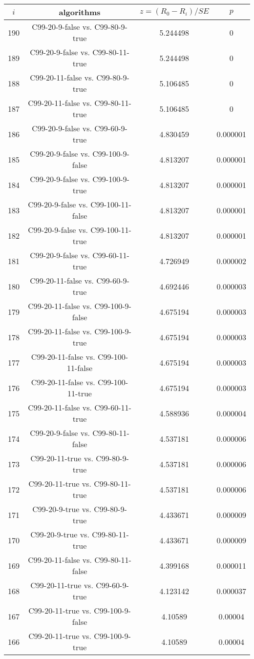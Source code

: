 \documentclass[a4paper,10pt]{article}
\begin{document}
\begin{landscape}
\begin{table}[!htp]
\centering\scriptsize
\begin{tabular}{cccc}
$i$&algorithms&$z=(R_0 - R_i)/SE$&$p$\\
\hline190&C99-20-9-false vs. C99-80-9-true&5.244498&0\\
189&C99-20-9-false vs. C99-80-11-true&5.244498&0\\
188&C99-20-11-false vs. C99-80-9-true&5.106485&0\\
187&C99-20-11-false vs. C99-80-11-true&5.106485&0\\
186&C99-20-9-false vs. C99-60-9-true&4.830459&0.000001\\
185&C99-20-9-false vs. C99-100-9-false&4.813207&0.000001\\
184&C99-20-9-false vs. C99-100-9-true&4.813207&0.000001\\
183&C99-20-9-false vs. C99-100-11-false&4.813207&0.000001\\
182&C99-20-9-false vs. C99-100-11-true&4.813207&0.000001\\
181&C99-20-9-false vs. C99-60-11-true&4.726949&0.000002\\
180&C99-20-11-false vs. C99-60-9-true&4.692446&0.000003\\
179&C99-20-11-false vs. C99-100-9-false&4.675194&0.000003\\
178&C99-20-11-false vs. C99-100-9-true&4.675194&0.000003\\
177&C99-20-11-false vs. C99-100-11-false&4.675194&0.000003\\
176&C99-20-11-false vs. C99-100-11-true&4.675194&0.000003\\
175&C99-20-11-false vs. C99-60-11-true&4.588936&0.000004\\
174&C99-20-9-false vs. C99-80-11-false&4.537181&0.000006\\
173&C99-20-11-true vs. C99-80-9-true&4.537181&0.000006\\
172&C99-20-11-true vs. C99-80-11-true&4.537181&0.000006\\
171&C99-20-9-true vs. C99-80-9-true&4.433671&0.000009\\
170&C99-20-9-true vs. C99-80-11-true&4.433671&0.000009\\
169&C99-20-11-false vs. C99-80-11-false&4.399168&0.000011\\
168&C99-20-11-true vs. C99-60-9-true&4.123142&0.000037\\
167&C99-20-11-true vs. C99-100-9-false&4.10589&0.00004\\
166&C99-20-11-true vs. C99-100-9-true&4.10589&0.00004\\

\end{tabular}
\end{table}
\end{landscape}
\end{document}
